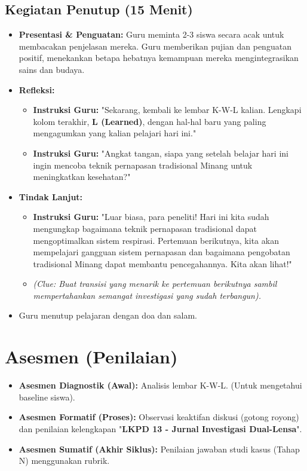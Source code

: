 \documentclass[a4paper,12pt]{article}
\begin{document}
\subsection{Kegiatan Penutup (15 Menit)}
\begin{itemize}
\item \textbf{Presentasi \& Penguatan:} Guru meminta 2-3 siswa secara acak untuk membacakan penjelasan mereka. Guru memberikan pujian dan penguatan positif, menekankan betapa hebatnya kemampuan mereka mengintegrasikan sains dan budaya.
\item \textbf{Refleksi:}
    \begin{itemize}
    \item \textbf{Instruksi Guru:} "Sekarang, kembali ke lembar K-W-L kalian. Lengkapi kolom terakhir, \textbf{L (Learned)}, dengan hal-hal baru yang paling mengagumkan yang kalian pelajari hari ini."
    \item \textbf{Instruksi Guru:} "Angkat tangan, siapa yang setelah belajar hari ini ingin mencoba teknik pernapasan tradisional Minang untuk meningkatkan kesehatan?"
    \end{itemize}
\item \textbf{Tindak Lanjut:}
    \begin{itemize}
    \item \textbf{Instruksi Guru:} "Luar biasa, para peneliti! Hari ini kita sudah mengungkap bagaimana teknik pernapasan tradisional dapat mengoptimalkan sistem respirasi. Pertemuan berikutnya, kita akan mempelajari gangguan sistem pernapasan dan bagaimana pengobatan tradisional Minang dapat membantu pencegahannya. Kita akan lihat!"
    \item \textit{(Clue: Buat transisi yang menarik ke pertemuan berikutnya sambil mempertahankan semangat investigasi yang sudah terbangun).}
    \end{itemize}
\item Guru menutup pelajaran dengan doa dan salam.
\end{itemize}

\section{Asesmen (Penilaian)}

\begin{itemize}
\item \textbf{Asesmen Diagnostik (Awal):} Analisis lembar K-W-L. (Untuk mengetahui baseline siswa).
\item \textbf{Asesmen Formatif (Proses):} Observasi keaktifan diskusi (gotong royong) dan penilaian kelengkapan "\textbf{LKPD 13 - Jurnal Investigasi Dual-Lensa}".
\item \textbf{Asesmen Sumatif (Akhir Siklus):} Penilaian jawaban studi kasus (Tahap N) menggunakan rubrik.
\end{itemize}
\end{document}
